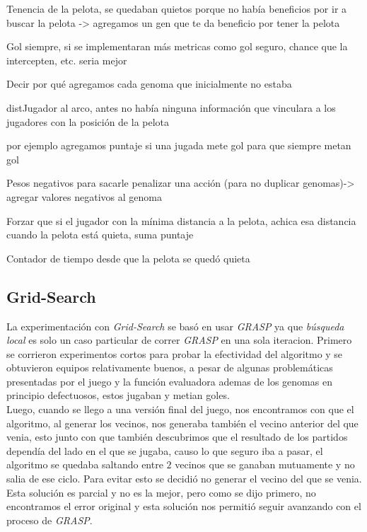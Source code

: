 Tenencia de la pelota, se quedaban quietos porque no había beneficios por ir a buscar la pelota -> agregamos un gen que te da beneficio por tener la pelota

Gol siempre, si se implementaran más metricas como gol seguro, chance que la intercepten, etc. seria mejor

Decir por qué agregamos cada genoma que inicialmente no estaba

distJugador al arco, antes no había ninguna información que vinculara a los jugadores con la posición de la pelota

por ejemplo agregamos puntaje si una jugada mete gol para que siempre metan gol

Pesos negativos para sacarle penalizar una acción (para no duplicar genomas)-> agregar valores negativos al genoma


Forzar que si el jugador con la mínima distancia a la pelota, achica esa distancia cuando la pelota está quieta, suma puntaje

Contador de tiempo desde que la pelota se quedó quieta




\subsection{Grid-Search}

La experimentación con \emph{Grid-Search} se basó en usar \emph{GRASP} ya que \emph{búsqueda local} es solo un caso particular
de correr \emph{GRASP} en una sola iteracion.
Primero se corrieron experimentos cortos para probar la efectividad del algoritmo y se obtuvieron equipos relativamente buenos,
a pesar de algunas problemáticas presentadas por el juego y la función evaluadora ademas de los genomas en principio defectuosos,
estos jugaban y metian goles.\\

Luego, cuando se llego a una versión final del juego, nos encontramos con que el algoritmo, al generar los vecinos, nos generaba también
el vecino anterior del que venia, esto junto con que también descubrimos que el resultado de los partidos dependía del lado en el
que se jugaba, causo lo que seguro iba a pasar, el algoritmo se quedaba saltando entre $2$ vecinos que se ganaban mutuamente y no
salia de ese ciclo.
Para evitar esto se decidió no generar el vecino del que se venia. Esta solución es parcial y no es la mejor, pero como se dijo primero,
no encontramos el error original y esta solución nos permitió seguir avanzando con el proceso de \emph{GRASP}.\\


